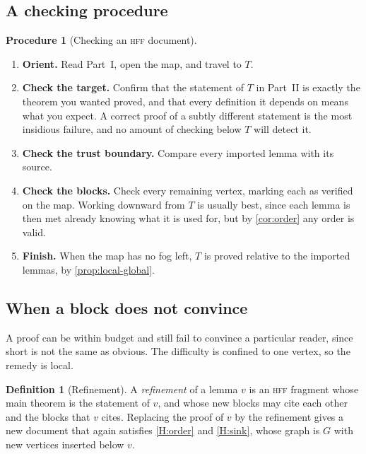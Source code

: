 \documentclass[11pt]{article}
\theoremstyle{plain}
\theoremstyle{definition}
\newtheorem{definition}[theorem]{Definition}
\newtheorem{procedure}[theorem]{Procedure}
\theoremstyle{remark}
\theoremstyle{definition}
\theoremstyle{plain}
\theoremstyle{remark}
\newcommand{\HFF}{\textsc{hff}}
\begin{document}
\subsection{A checking procedure}

\begin{procedure}[Checking an \HFF{} document]\label{proc:check}
\leavevmode
\begin{enumerate}[label=\textbf{Step \arabic*.}, leftmargin=*, align=left]
  \item \textbf{Orient.} Read Part~I, open the map, and travel to $T$.
  \item \textbf{Check the target.} Confirm that the statement of $T$ in Part~II is exactly the theorem you wanted proved, and that every definition it depends on means what you expect. A correct proof of a subtly different statement is the most insidious failure, and no amount of checking below $T$ will detect it.
  \item \textbf{Check the trust boundary.} Compare every imported lemma with its source.
  \item \textbf{Check the blocks.} Check every remaining vertex, marking each as verified on the map. Working downward from $T$ is usually best, since each lemma is then met already knowing what it is used for, but by \cref{cor:order} any order is valid.
  \item \textbf{Finish.} When the map has no fog left, $T$ is proved relative to the imported lemmas, by \cref{prop:local-global}.
\end{enumerate}
\end{procedure}

\subsection{When a block does not convince}\label{sec:refine}

A proof can be within budget and still fail to convince a particular reader, since short is not the same as obvious. The difficulty is confined to one vertex, so the remedy is local.

\begin{definition}[Refinement]\label{def:refine}
A \emph{refinement} of a lemma $v$ is an \HFF{} fragment whose main theorem is the statement of $v$, and whose new blocks may cite each other and the blocks that $v$ cites. Replacing the proof of $v$ by the refinement gives a new document that again satisfies \ref{H:order} and \ref{H:sink}, whose graph is $G$ with new vertices inserted below $v$.
\end{definition}
\end{document}
